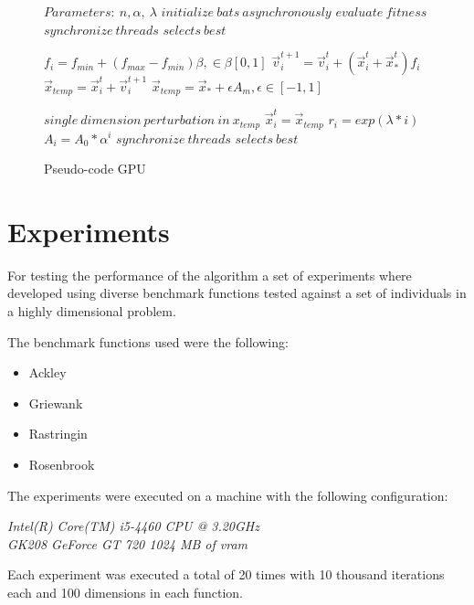 \documentclass[conference]{IEEEtran}
\begin{document}
\begin{figure}
\begin{algorithmic}[1]
\State $Parameters:\ n,\alpha,\ \lambda$
\State $initialize\ bats\ asynchronously$
\State $evaluate\ fitness$
\State $synchronize\ threads$
\State $selects\ best$

        \State $f_i=f_{min} + (f_{max} - f_{min})\beta, \in \beta [0,1]$
        \State $\vec{v}_i^{t+1} = \vec{v}_i^{t} + (\vec{x}_i^{t} + \vec{x}_*^{t})f_i$
        \State $\vec{x}_{temp} = \vec{x}_i^{t} + \vec{v}_i^{t+1}$
            \State $\vec{x}_{temp} = \vec{x}_* + \epsilon A_m, \epsilon \in [-1, 1]$
        \EndIf

        \State $single\ dimension\ perturbation\ in\ x_{temp}$
            \State $\vec{x}_i^t = \vec{x}_{temp}$
            \State $r_i = exp(\lambda * i)$
            \State $A_i =  A_{0} * \alpha^i$
        \EndIf
        \State $synchronize\ threads$
        \State $selects\ best$
    \EndFor
\EndWhile
\end{algorithmic}
\caption{Pseudo-code GPU}\label{GPU}
\end{figure}

\section{Experiments}

For testing the performance of the algorithm a set of experiments where
developed using diverse benchmark functions tested against a set of
individuals in a highly dimensional problem.

The benchmark functions used were the following:

\begin{itemize}
    \item Ackley
    \item Griewank
    \item Rastringin
    \item Rosenbrook
\end{itemize}

The experiments were executed on a machine with the following configuration:

\textit{Intel(R) Core(TM) i5-4460  CPU @ 3.20GHz \\ GK208 GeForce GT 720 1024 MB of vram}

Each experiment was executed a total of 20 times with 10 thousand
iterations each and 100 dimensions in each function.
\end{document}
